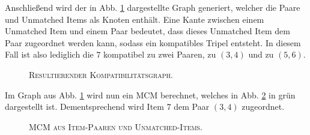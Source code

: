 Anschließend wird der in Abb. \ref{fig:graph_for_pairs_and_unmatched} dargestellte Graph generiert, welcher die Paare und
Unmatched Items als Knoten enthält. Eine Kante zwischen einem Unmatched Item und einem Paar bedeutet, dass dieses Unmatched
Item dem Paar zugeordnet werden kann, sodass ein kompatibles Tripel entsteht.
In diesem Fall ist also lediglich die $7$ kompatibel zu zwei Paaren, zu $(3, 4)$ und zu $(5, 6)$.

\begin{figure}[H]
\centering
{}
\caption{\textsc{Resultierender Kompatibilitätsgraph.}}
\label{fig:graph_for_pairs_and_unmatched}
\end{figure}

Im Graph aus Abb. \ref{fig:graph_for_pairs_and_unmatched} wird nun ein \textsc{MCM} berechnet, welches
in Abb. \ref{fig:mcm_for_pairs_and_unmatched} in grün dargestellt ist.
Dementsprechend wird Item $7$ dem Paar $(3, 4)$ zugeordnet.

\begin{figure}[H]
\centering
{}
\caption{\textsc{MCM aus Item-Paaren und Unmatched-Items.}}
\label{fig:mcm_for_pairs_and_unmatched}
\end{figure}

